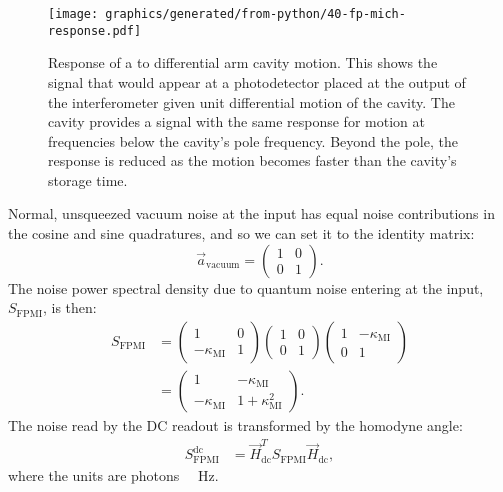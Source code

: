 \begin{figure}
  \centering
  \texttt{[image: graphics/generated/from-python/40-fp-mich-response.pdf]}
  \caption[Response of a \FPMI{} to differential arm cavity motion]{\label{fig:fp-mich-response}Response of a \FPMI{} to differential arm cavity motion. This shows the signal that would appear at a photodetector placed at the output of the interferometer given unit differential motion of the cavity. The cavity provides a signal with the same response for motion at frequencies below the cavity's pole frequency. Beyond the pole, the response is reduced as the motion becomes faster than the cavity's storage time.}
\end{figure}

Normal, unsqueezed vacuum noise at the input has equal noise contributions in the cosine and sine quadratures, and so we can set it to the identity matrix:
\begin{equation}
  \label{eq:unsqueezed-vacuum-amplitude}
  \vec{a}_{\text{vacuum}} =
  \begin{pmatrix}
   1 & 0 \\
   0 & 1
  \end{pmatrix}.
\end{equation}
The noise power spectral density due to quantum noise entering at the input, $S_{\text{FPMI}}$, is then:
\begin{equation}
  \begin{split}
    S_{\text{FPMI}} &=
    \begin{pmatrix}
      1 & 0 \\
      -\kappa_{\text{MI}} & 1
    \end{pmatrix}
    \begin{pmatrix}
      1 & 0 \\
      0 & 1
    \end{pmatrix}
    \begin{pmatrix}
      1 & -\kappa_{\text{MI}} \\
      0 & 1
    \end{pmatrix} \\
    &=
    \begin{pmatrix}
      1 & -\kappa_{\text{MI}} \\
      -\kappa_{\text{MI}} & 1 + \kappa^2_{\text{MI}}
    \end{pmatrix}.
  \end{split}
\end{equation}
The noise read by the \gls{DC} readout is transformed by the homodyne angle:
\begin{equation}
  \begin{split}
    S_{\text{FPMI}}^{\text{dc}} &= \vec{H}_{\text{dc}}^{T} S_{\text{FPMI}} \vec{H}_{\text{dc}},
  \end{split}
\end{equation}
where the units are photons \SI{}{\per\hertz}.

